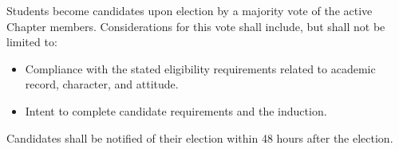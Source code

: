 \documentclass[10pt, oneside]{article}
\begin{document}
Students become candidates upon election by a majority vote of the active Chapter members. Considerations for this vote shall include, but shall not be limited to:

\begin{itemize}
    \item Compliance with the stated eligibility requirements related to academic record, character, and attitude.
    \item Intent to complete candidate requirements and the induction.
\end{itemize}

Candidates shall be notified of their election within 48 hours after the election.

\end{document}
